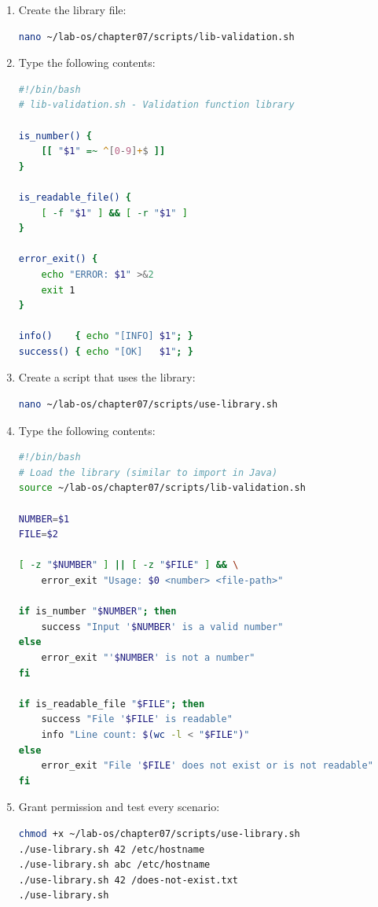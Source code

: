 \begin{enumerate}
  \item Create the library file:
\begin{lstlisting}[language=bash, caption={Creating lib-validation.sh}]
nano ~/lab-os/chapter07/scripts/lib-validation.sh
\end{lstlisting}

  \item Type the following contents:
\begin{lstlisting}[language=bash, caption={Contents of lib-validation.sh}]
#!/bin/bash
# lib-validation.sh - Validation function library

is_number() {
    [[ "$1" =~ ^[0-9]+$ ]]
}

is_readable_file() {
    [ -f "$1" ] && [ -r "$1" ]
}

error_exit() {
    echo "ERROR: $1" >&2
    exit 1
}

info()    { echo "[INFO] $1"; }
success() { echo "[OK]   $1"; }
\end{lstlisting}

  \item Create a script that uses the library:
\begin{lstlisting}[language=bash, caption={Creating use-library.sh}]
nano ~/lab-os/chapter07/scripts/use-library.sh
\end{lstlisting}

  \item Type the following contents:
\begin{lstlisting}[language=bash, caption={Contents of use-library.sh}]
#!/bin/bash
# Load the library (similar to import in Java)
source ~/lab-os/chapter07/scripts/lib-validation.sh

NUMBER=$1
FILE=$2

[ -z "$NUMBER" ] || [ -z "$FILE" ] && \
    error_exit "Usage: $0 <number> <file-path>"

if is_number "$NUMBER"; then
    success "Input '$NUMBER' is a valid number"
else
    error_exit "'$NUMBER' is not a number"
fi

if is_readable_file "$FILE"; then
    success "File '$FILE' is readable"
    info "Line count: $(wc -l < "$FILE")"
else
    error_exit "File '$FILE' does not exist or is not readable"
fi
\end{lstlisting}

  \item Grant permission and test every scenario:
\begin{lstlisting}[language=bash, caption={Testing all scenarios}]
chmod +x ~/lab-os/chapter07/scripts/use-library.sh
./use-library.sh 42 /etc/hostname
./use-library.sh abc /etc/hostname
./use-library.sh 42 /does-not-exist.txt
./use-library.sh
\end{lstlisting}
\end{enumerate}

